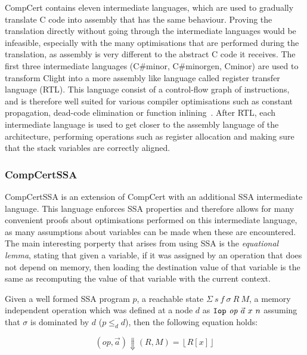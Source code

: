 CompCert contains eleven intermediate languages, which are used to gradually translate C code into
assembly that has the same behaviour.  Proving the translation directly without going through the
intermediate languages would be infeasible, especially with the many optimisations that are
performed during the translation, as assembly is very different to the abstract C code it receives.
The first three intermediate languages (C\#minor, C\#minorgen, Cminor) are used to transform Clight
into a more assembly like language called register transfer language (RTL).  This language consist
of a control-flow graph of instructions, and is therefore well suited for various compiler
optimisations such as constant propagation, dead-code elimination or function
inlining~\cite{tristan08_formal_verif_trans_valid}.  After RTL, each intermediate language is used
to get closer to the assembly language of the architecture, performing operations such as register
allocation and making sure that the stack variables are correctly aligned.

\subsubsection{CompCertSSA}

CompCertSSA is an extension of CompCert with an additional \gls{SSA} intermediate
language.  This language enforces \gls{SSA} properties and therefore allows for many convenient proofs
about optimisations performed on this intermediate language, as many assumptions about variables can
be made when these are encountered.  The main interesting porperty that arises from using \gls{SSA} is
the \emph{equational lemma}, stating that given a variable, if it was assigned by an operation that
does not depend on memory, then loading the destination value of that variable is the same as
recomputing the value of that variable with the current context.

Given a well formed SSA program $p$, a reachable state $\Sigma\ s\ f\ \sigma\ R\ M$, a memory
independent operation which was defined at a node $d$ as $\mono{Iop}\ \mathit{op}\ \vec{a}\ x\ n$
assuming that $\sigma$ is dominated by $d$ ($p \le_{d} d$), then the following equation holds:

\begin{equation}\label{eq:equational-lemma}
  \left(\mathit{op}, \vec{a}\right) \Downarrow (R, M) = \left\lfloor R[x] \right\rfloor
\end{equation}

